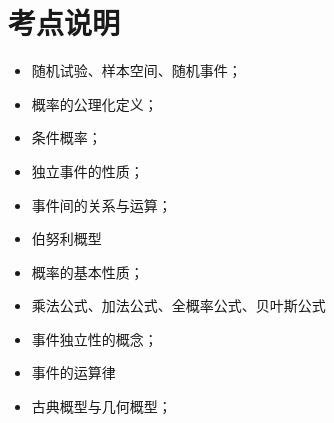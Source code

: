 \section{考点说明}
\begin{itemize}
\item 随机试验、样本空间、随机事件；
\item 概率的公理化定义；
\item 条件概率；
\item 独立事件的性质；
\item 事件间的关系与运算；
\item 伯努利概型
\item 概率的基本性质；
\item 乘法公式、加法公式、全概率公式、贝叶斯公式
\item 事件独立性的概念；
\item 事件的运算律
\item 古典概型与几何概型；
\end{itemize}

